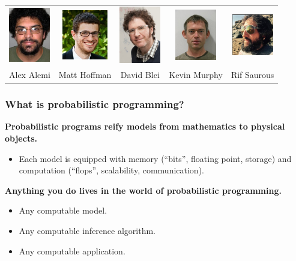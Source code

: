 \documentclass[10pt,
               xcolor={usenames,dvipsnames},
               hyperref={colorlinks,linktoc=all,citecolor=Plum,linkcolor=MidnightBlue,urlcolor=MidnightBlue},noamssymb]{beamer}
\begin{document}
\begin{frame}[plain]
\begin{center}
\begin{tabular}{ccccc}
\includegraphics[width=18mm]{img/alex.jpg} &
\includegraphics[width=20mm]{img/matt.jpg} &
\includegraphics[width=18mm]{img/blei.jpg} &
\includegraphics[width=18mm]{img/kevin.jpg} &
\includegraphics[width=18mm]{img/rif.png}\\
Alex Alemi & Matt Hoffman & David Blei & Kevin Murphy & Rif Saurous\\
\end{tabular}
\end{center}
\end{frame}

\begin{frame}
\frametitle{What is probabilistic programming?}
\textbf{Probabilistic programs reify models from mathematics to
physical objects.}
\begin{itemize}
\vspace{-2ex}
\item
Each model is equipped with memory (``bits'',
floating point, storage) and computation
(``flops'', scalability, communication).
\end{itemize}
\textbf{Anything you do lives in the world of probabilistic programming.}
\begin{itemize}
\item
Any computable model.
\item
Any computable inference algorithm.
\item
Any computable application.
\end{itemize}
\end{frame}
\end{document}
